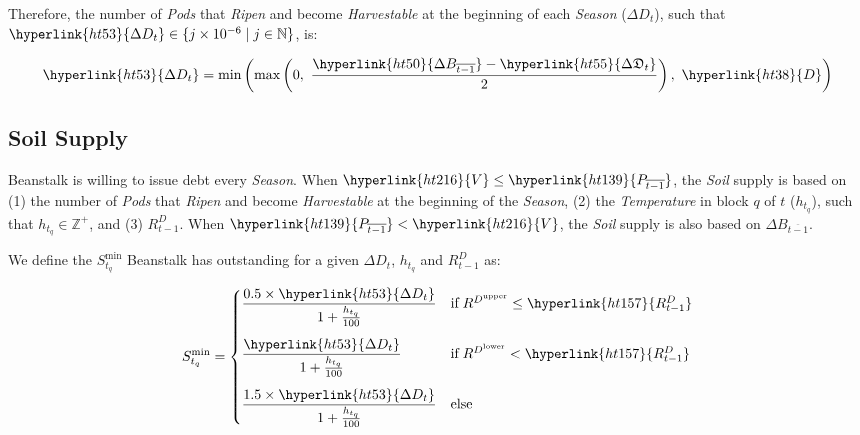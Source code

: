 \documentclass[tikz]{article}
\newcommand{\term}[1]{\textsl{#1}}
\begin{document}
Therefore, the number of \term{Pods} that \term{Ripen} and become \term{Harvestable} at the beginning of each \term{Season} (\hyperlink{ht53}{$\Delta D_t$}), such that $\hyperlink{ht53}{\Delta D_t} \in \{j \times 10^{-6} \mid j \in \mathbb{N} \}$, is:

\vspace*{1mm}

    $$
        \hyperlink{ht53}{\Delta D_t} = 
            \text{min}\left(\text{max}\left
                (0,\ \frac{\hyperlink{ht50}{\Delta B_{\overline{t-1}}} - \hyperlink{ht55}{\Delta \mathfrak{D}_t}}{2}\right),\ \hyperlink{ht38}{D}\right)
    $$


\subsection{Soil Supply}

Beanstalk is willing to issue debt every \term{Season}. When $\hyperlink{ht216}{V} \leq \hyperlink{ht139}{P_{\overline{t-1}}}$, the \term{Soil} supply is based on (1) the number of \term{Pods} that \term{Ripen} and become \term{Harvestable} at the beginning of the \term{Season}, (2) the \term{Temperature} in block $q$ of $t$ ($h_{t_q}$), such that $h_{t_q} \in \mathbb{Z}^{+}$, and (3) \hyperlink{ht157}{$R^D_{t-1}$}. When $\hyperlink{ht139}{P_{\overline{t-1}}} < \hyperlink{ht216}{V}$, the \term{Soil} supply is also based on \hyperlink{ht50}{$\Delta B_{\overline{t-1}}$}.

We define the $S_{t_q}^{\text{min}}$ Beanstalk has outstanding for a given \hyperlink{ht53}{$\Delta D_t$}, {$h_{t_q}$} and \hyperlink{ht157}{$R^D_{t-1}$} as:

\vspace*{2mm}

    $$
        S_{t_q}^{\text{min}} = 
            \begin{cases} 
                \dfrac{0.5 \times \hyperlink{ht53}{\Delta D_t}}{1 + \frac{h_{t_q}}{100}}
                    & \text{if} \; R^{D^{\text{upper}}} \leq \hyperlink{ht157}{R^D_{t-1}} \vspace{.3cm} \\ 
                \dfrac{\hyperlink{ht53}{\Delta D_t}}{1 + \frac{h_{t_q}}{100}} 
                    & \text{if} \; R^{D^{\text{lower}}} < \hyperlink{ht157}{R^D_{t-1}} \vspace{.3cm} \\ 
                \dfrac{1.5 \times \hyperlink{ht53}{\Delta D_t}}{1 + \frac{h_{t_q}}{100}} 
                    & \text{else} 
            \end{cases}
    $$
\end{document}
